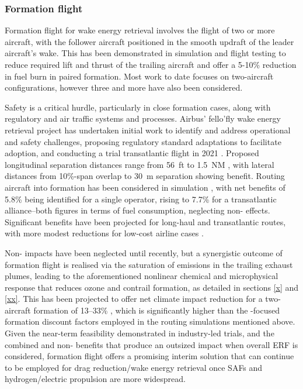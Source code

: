 \subsubsection{Formation flight}
\label{Formation_flight}
Formation flight for wake energy retrieval involves the flight of two or more aircraft, with the follower aircraft positioned in the smooth updraft of the leader aircraft’s wake. This has been demonstrated in simulation \cite{Venkataramanan2003} and flight testing \cite{Hanson2002, Kniffin2016} to reduce required lift and thrust of the trailing aircraft and offer a 5-10\% reduction in fuel burn in paired formation. Most work to date focuses on two-aircraft configurations, however three \cite{Bower2009} and more have also been considered.

Safety is a critical hurdle, particularly in close formation cases, along with regulatory and air traffic systems and processes. Airbus' fello’fly wake energy retrieval project has undertaken initial work to identify and address operational and safety challenges, proposing regulatory standard adaptations to facilitate adoption, and conducting a trial transatlantic flight in 2021 \cite{Airbus2021}. Proposed longitudinal separation distances range from 56~ft \cite{Hanson2002} to 1.5~NM \cite{Airbus2021}, with lateral distances from 10\%-span overlap to 30~m separation showing benefit. Routing aircraft into formation has been considered in simulation \cite{Xu2014}, with net benefits of 5.8\% being identified for a single operator, rising to 7.7\% for a transatlantic alliance--both figures in terms of fuel consumption, neglecting non- effects. Significant benefits have been projected for long-haul and transatlantic routes, with more modest reductions for low-cost airline cases \cite{Kent2020}. 

Non- impacts have been neglected until recently, but a synergistic outcome of formation flight is realised via the saturation of emissions in the trailing exhaust plumes, leading to the aforementioned nonlinear chemical and microphysical response that reduces ozone and contrail formation, as detailed in sections \ref{x} and \ref{xx}. This has been projected to offer net climate impact reduction for a two-aircraft formation of 13--33\% \cite{Dahlmann2020}, which is significantly higher than the -focused formation discount factors employed in the routing simulations mentioned above. Given the near-term feasibility demonstrated in industry-led trials, and the combined  and non- benefits that produce an outsized impact when overall ERF is considered, formation flight offers a promising interim solution that can continue to be employed for drag reduction/wake energy retrieval once SAFs and hydrogen/electric propulsion are more widespread.

